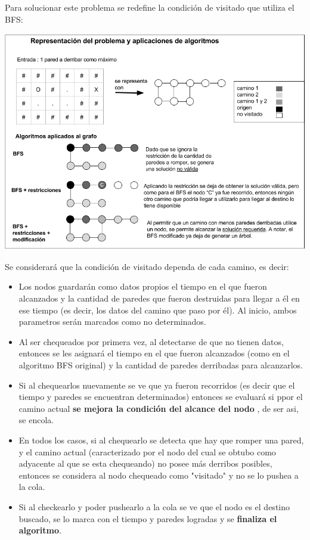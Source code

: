 Para solucionar este problema se redefine la condición de visitado que utiliza el BFS:

  \vspace*{0.3cm} \vspace*{0.3cm}
  \begin{center}
 \includegraphics[scale=0.6]{./EJ1/ej1-explicacion.png}
  \end{center}
  \vspace*{0.3cm}

Se considerará que la condición de visitado dependa de cada camino, es decir:

\begin{itemize}
	\item Los nodos guardarán como datos propios el tiempo en el que fueron alcanzados y la cantidad de paredes que fueron destruidas para llegar a él en ese tiempo (es decir, los datos del camino que paso por él). Al inicio, ambos parametros serán marcados como no determinados.
	\item Al ser chequeados por primera vez, al detectarse de que no tienen datos, entonces se les asignará el tiempo en el que fueron alcanzados (como en el algoritmo BFS original) y la cantidad de paredes derribadas para alcanzarlos.
	\item Si al chequearlos nuevamente se ve que ya fueron recorridos (es decir que el tiempo y paredes se encuentran determinados) entonces se evaluará si ppor el camino actual {\bf se mejora la condición del alcance del nodo} , de ser asi, se encola.
	\item En todos los casos, si al chequearlo se detecta que hay que romper una pared, y el camino actual (caracterizado por el nodo del cual se obtubo como adyacente al que se esta chequeando) no posee más derribos posibles, entonces se considera al nodo chequeado como "visitado" y no se lo pushea a la cola.
	\item Si al checkearlo y poder pushearlo a la cola se ve que el nodo es el destino buscado, se lo marca con el tiempo y paredes logradas y se {\bf finaliza el algoritmo}.
	
\end{itemize}

